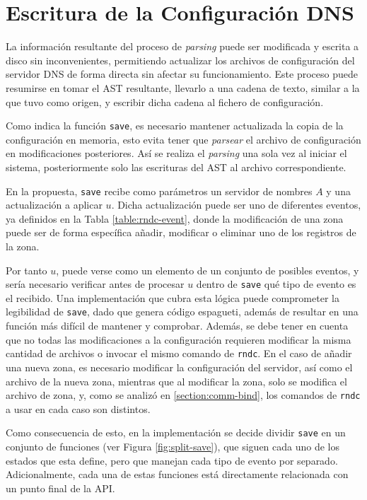 \section{Escritura de la Configuración DNS}

La información resultante del proceso de \textit{parsing} puede ser modificada y escrita a disco sin inconvenientes, permitiendo actualizar los archivos de configuración del servidor DNS de forma directa sin afectar su funcionamiento. Este proceso puede resumirse en tomar el AST resultante, llevarlo a una cadena de texto, similar a la que tuvo como origen, y escribir dicha cadena al fichero de configuración.

Como indica la función \verb+save+, es necesario mantener actualizada la copia de la configuración en memoria, esto evita tener que \textit{parsear} el archivo de configuración en modificaciones posteriores. Así se realiza el \textit{parsing} una sola vez al iniciar el sistema, posteriormente solo las escrituras del AST al archivo correspondiente.

En la propuesta, \verb|save| recibe como parámetros un servidor de nombres $A$ y una actualización a aplicar $u$. Dicha actualización puede ser uno de diferentes eventos, ya definidos en la Tabla \ref{table:rndc-event}, donde la modificación de una zona puede ser de forma específica añadir, modificar o eliminar uno de los registros de la zona.

Por tanto $u$, puede verse como un elemento de un conjunto de posibles eventos, y sería necesario verificar antes de procesar $u$ dentro de \verb|save| qué tipo de evento es el recibido. Una implementación que cubra esta lógica puede comprometer la legibilidad de \verb|save|, dado que genera código espagueti, además de resultar en una función más difícil de mantener y comprobar. Además, se debe tener en cuenta que no todas las modificaciones a la configuración requieren modificar la misma cantidad de archivos o invocar el mismo comando de \verb|rndc|. En el caso de añadir una nueva zona, es necesario modificar la configuración del servidor, así como el archivo de la nueva zona, mientras que al modificar la zona, solo se modifica el archivo de zona, y, como se analizó en \ref{section:comm-bind}, los comandos de \verb|rndc| a usar en cada caso son distintos.

Como consecuencia de esto, en la implementación se decide dividir \verb|save| en un conjunto de funciones (ver Figura \ref{fig:split-save}), que siguen cada uno de los estados que esta define, pero que manejan cada tipo de evento por separado. Adicionalmente, cada una de estas funciones está directamente relacionada con un punto final de la API.

